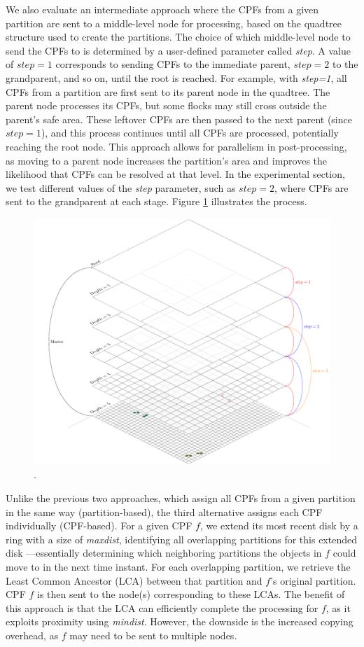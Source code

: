 We also evaluate an intermediate approach where the CPFs from a given partition are sent to a middle-level node for processing, based on the quadtree structure used to create the partitions. The choice of which middle-level node to send the CPFs to is determined by a user-defined parameter called \textit{step}. A value of $step = 1$ corresponds to sending CPFs to the immediate parent, $step = 2$ to the grandparent, and so on, until the root is reached. For example, with \textit{step=1}, all CPFs from a partition are first sent to its parent node in the quadtree. The parent node processes its CPFs, but some flocks may still cross outside the parent's safe area.  These leftover CPFs are then passed to the next parent (since $step = 1$), and this process continues until all CPFs are processed, potentially reaching the root node. This approach allows for parallelism in post-processing, as moving to a parent node increases the partition's area and improves the likelihood that CPFs can be resolved at that level. In the experimental section, we test different values of the \textit{step} parameter, such as $step=2$, where CPFs are sent to the grandparent at each stage.  Figure \ref{fig:master-bylevel_alternative} illustrates the process.

\begin{figure}
    \centering
    \includegraphics[width=0.75\linewidth]
    {chapterPFlocks/figures/plots/11_temporal_partitions/MasterByLevel}
    \caption{.}\label{fig:master-bylevel_alternative}
\end{figure}

Unlike the previous two approaches, which assign all CPFs from a given partition in the same way (partition-based), the third alternative assigns each CPF individually (CPF-based). For a given CPF $f$, we extend its most recent disk by a ring with a size of \textit{maxdist}, identifying all overlapping partitions for this extended disk —essentially determining which neighboring partitions the objects in $f$ could move to in the next time instant. For each overlapping partition, we retrieve the Least Common Ancestor (LCA) between that partition and $f$'s original partition. CPF $f$ is then sent to the node(s) corresponding to these LCAs. The benefit of this approach is that the LCA can efficiently complete the processing for $f$, as it exploits proximity using \textit{mindist}.  However, the downside is the increased copying overhead, as $f$ may need to be sent to multiple nodes.

